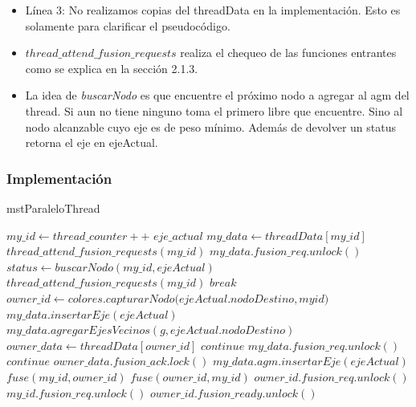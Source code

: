 \begin{itemize}
    \item Línea 3: No realizamos copias del threadData en la implementación. Esto es solamente para clarificar el pseudocódigo.
    \item $thread\_attend\_fusion\_requests$ realiza el chequeo de las funciones entrantes como se explica en la sección 2.1.3.
    \item La idea de \textit{buscarNodo} es que encuentre el próximo nodo a agregar al agm del thread. Si aun no tiene ninguno toma el primero libre que encuentre. Sino al nodo alcanzable cuyo eje es de peso mínimo. Además de devolver un status retorna el eje en ejeActual.
\end{itemize}

\newpage

\subsubsection{Implementación}

\begin{algorithm}
\caption{mstParaleloThread}
\begin{algorithmic}[1]

\STATE $my\_id \gets thread\_counter++ $
\STATE $eje\_actual$
\STATE $my\_data \gets threadData[my\_id]$
\STATE $thread\_attend\_fusion\_requests(my\_id)$
\STATE $my\_data.fusion\_req.unlock()$
\STATE $status \gets buscarNodo(my\_id,ejeActual)$
\STATE $thread\_attend\_fusion\_requests(my\_id)$
\ENDIF
{}
\STATE $break$
\ENDIF
\STATE $owner\_id \gets colores.capturarNodo(ejeActual.nodoDestino,my$\textunderscore$id)$
\STATE $my\_data.insertarEje(ejeActual)$
\STATE $my\_data.agregarEjesVecinos(g,ejeActual.nodoDestino)$
\ELSE 
\STATE $owner\_data \gets threadData[owner\_id]$
\STATE $continue$
\ENDIF
{}
\STATE $my\_data.fusion\_req.unlock()$
\STATE $continue$
\ENDIF
\STATE $owner\_data.fusion\_ack.lock()$
\STATE $my\_data.agm.insertarEje(ejeActual)$
\STATE $fuse(my\_id,owner\_id)$
\ELSE
\STATE $fuse(owner\_id,my\_id)$
\ENDIF
\ENDIF
\ENDIF
\STATE $owner\_id.fusion\_req.unlock()$
\STATE $my\_id.fusion\_req.unlock()$
\STATE $owner\_id.fusion\_ready.unlock()$
\ENDWHILE

\end{algorithmic}
\end{algorithm}
